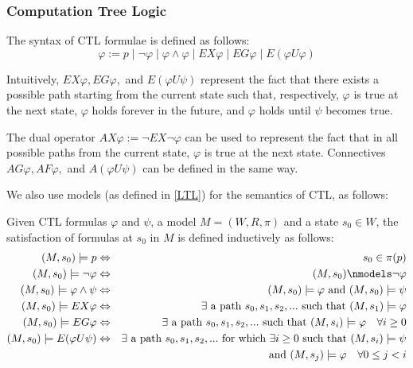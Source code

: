 \documentclass[12]{article}
\newenvironment{definition}[1][Definition]{\begin{trivlist}
\item[\hskip \labelsep {\bfseries #1}]}{\end{trivlist}}
\begin{document}
\subsubsection{Computation Tree Logic} 

\begin{definition} 
The syntax of CTL formulae is defined as follows: 
$$ \varphi := p \mid \lnot \varphi \mid \varphi \land \varphi \mid EX\varphi \mid EG\varphi \mid E(\varphi U \varphi)$$
\end{definition}

Intuitively, $ EX\varphi,  EG\varphi,$ and $ E(\varphi U \psi)$ represent the fact that there exists a possible path starting from the current state such that, respectively, $\varphi$ is true at the next state, $\varphi$ holds forever in the future, and $\varphi$ holds until $\psi$ becomes true.

The dual operator $AX\varphi := \lnot EX \lnot\varphi $ can be used to represent the fact that in all possible paths from the current state, $\varphi$ is true at the next state.
Connectives $AG\varphi, AF\varphi,$ and $A(\varphi U\psi)$ can be defined in the same way. 

We also use models (as defined in \ref{LTL}) for the semantics of CTL, as follows:

\begin{definition} 
Given CTL formulas $\varphi$ and $\psi$, a model $M = (W, R, \pi)$ and a state $s_0 \in W$, the satisfaction of formulas at $s_0$ in $M$ is defined inductively as follows: 
\begin{eqnarray*}
(M, s_0) \models p &\Leftrightarrow& s_0 \in \pi(p) \\  
(M, s_0) \models \lnot \varphi &\Leftrightarrow& (M, s_0) \nmodels \lnot \varphi\\
(M, s_0) \models \varphi \land \psi &\Leftrightarrow& (M, s_0) \models \varphi \mbox{ and  } (M, s_0) \models \psi \\
(M, s_0) \models EX\varphi &\Leftrightarrow& \exists \mbox{ a path } s_0, s_1, s_2, ... \mbox{ such that } (M, s_1) \models \varphi \\
(M, s_0) \models EG\varphi &\Leftrightarrow& \exists \mbox{ a path } s_0, s_1, s_2, ... \mbox{ such that } (M, s_i) \models \varphi \quad \forall i \geq 0\\
(M, s_0) \models E(\varphi U\psi) &\Leftrightarrow&  \exists \mbox{ a path } s_0, s_1, s_2, ... \mbox{ for which } \exists i \geq 0 \mbox{ such that }  (M, s_i) \models \psi \\ && \mbox{ and }  (M, s_j) \models \varphi \quad \forall 0 \leq j < i
\end{eqnarray*}
\end{definition}
\end{document}
